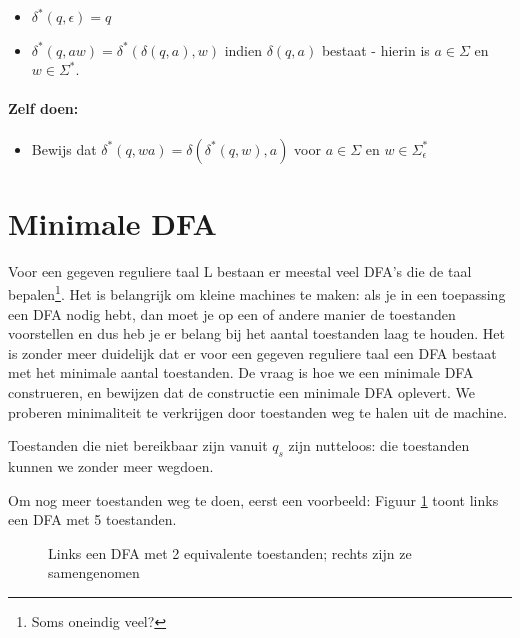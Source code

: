 \begin{itemize}
\item $\delta^*(q,\epsilon) = q$
\item $\delta^*(q,aw) = \delta^*(\delta(q,a),w)$ indien $\delta(q,a)$
bestaat - hierin is $a \in \Sigma$ en $w \in \Sigma^*$.
\end{itemize}

\paragraph{Zelf doen:}
\begin{itemize}
\item[]
Bewijs dat $\delta^*(q,wa) = \delta(\delta^*(q,w),a)$ voor $a \in
\Sigma$ en $w \in \Sigma_{\epsilon}^*$
\end{itemize}

\clearpage
\section{Minimale DFA}\label{minfsa}

Voor een gegeven reguliere taal L bestaan er meestal veel DFA's die de
taal bepalen\footnote{Soms oneindig veel?}. Het is belangrijk om
kleine machines te maken: als je in een toepassing een DFA nodig hebt,
dan moet je op een of andere manier de toestanden voorstellen en dus
heb je er belang bij het aantal toestanden laag te houden. Het is
zonder meer duidelijk dat er voor een gegeven reguliere taal een DFA
bestaat met het minimale aantal toestanden. De vraag is hoe we een
minimale DFA construeren, en bewijzen dat de constructie een minimale
DFA oplevert. We proberen minimaliteit te verkrijgen door toestanden
weg te halen uit de machine.


Toestanden die niet bereikbaar zijn vanuit $q_s$ zijn nutteloos: die
toestanden kunnen we zonder meer wegdoen.


Om nog meer toestanden weg te doen, eerst een voorbeeld: Figuur
\ref{mini1} toont links een DFA met 5 toestanden.

\begin{figure}[h]
\caption{ Links een DFA met 2 equivalente toestanden; rechts zijn ze
samengenomen\label{mini1}}
\end{figure}



